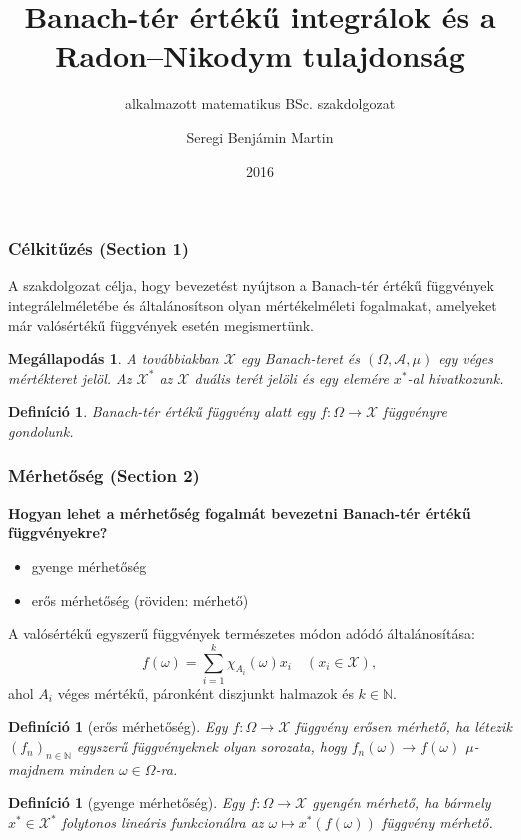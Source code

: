\documentclass{beamer} %
\title{Banach-tér értékű integrálok és a Radon\---Nikodym tulajdonság}
\subtitle{alkalmazott matematikus BSc. szakdolgozat}
\author{Seregi Benjámin Martin}
\institute{Eötvös Loránd Tudományegyetem}
\date{2016}
\newtheorem{defi}[lem]{Definíció}
\newtheorem{megall}[lem]{Megállapodás}
\begin{document}
\frame{\titlepage}
\begin{frame}
\frametitle{Célkitűzés (Section 1)}
\justifying
A szakdolgozat célja, hogy bevezetést nyújtson a Banach-tér értékű függvények integrálelméletébe és általánosítson olyan mértékelméleti fogalmakat, amelyeket már valósértékű függvények esetén megismertünk.
\pause \begin{megall}
A továbbiakban $\mathcal{X}$ egy Banach-teret és $(\Omega, \mathcal{A}, \mu)$ egy véges mértékteret jelöl. Az $\mathcal{X}^*$ az $\mathcal{X}$ duális terét jelöli és egy elemére $x^*$-al hivatkozunk.
\end{megall}
\pause \begin{defi}
Banach-tér értékű függvény alatt egy  $f \colon \Omega \to \mathcal{X}$ függvényre gondolunk.
\end{defi}
\end{frame}

\begin{frame}
\frametitle{Mérhetőség (Section 2)}
\justifying
\textbf{Hogyan lehet a mérhetőség fogalmát bevezetni Banach-tér értékű függvényekre?}
\begin{itemize}
\pause \item gyenge mérhetőség
\pause \item erős mérhetőség (röviden: mérhető)
\end{itemize}
\end{frame}

\begin{frame}
A valósértékű egyszerű függvények természetes módon adódó általánosítása:
$$f(\omega) = \sum^k_{i=1} \chi_{A_i}(\omega)x_i \quad (x_i \in \mathcal{X}),$$
\pause ahol $A_i$ véges mértékű, páronként diszjunkt halmazok és $k \in \mathbb{N}$.
\pause \begin{defi}[erős mérhetőség] Egy $f \colon \Omega \to \mathcal{X}$ függvény erősen mérhető, ha létezik $(f_n)_{n \in \mathbb{N}}$ egyszerű függvényeknek olyan sorozata, hogy $f_n(\omega) \to f(\omega)$ $\mu$-majdnem minden $\omega \in \Omega$-ra.
\end{defi}
\pause\begin{defi}[gyenge mérhetőség] Egy $f \colon \Omega \to \mathcal{X}$ gyengén mérhető, ha bármely $x^* \in \mathcal{X}^*$ folytonos lineáris funkcionálra az $\omega \mapsto x^*(f(\omega))$ függvény mérhető.
\end{defi}
\end{frame}
\end{document}
